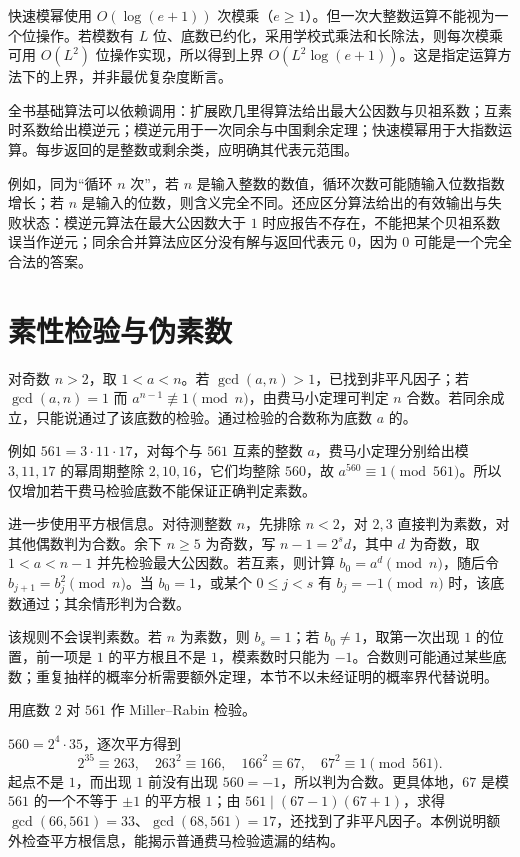 \documentclass[UTF8,12pt,a4paper,fontset=fandol]{ctexbook}
\begin{document}
快速模幂使用 $O(\log(e+1))$ 次模乘（$e\ge1$）。但一次大整数运算不能视为一个位操作。若模数有 $L$ 位、底数已约化，采用学校式乘法和长除法，则每次模乘可用 $O(L^2)$ 位操作实现，所以得到上界 $O(L^2\log(e+1))$。这是指定运算方法下的上界，并非最优复杂度断言。

全书基础算法可以依赖调用：扩展欧几里得算法给出最大公因数与贝祖系数；互素时系数给出模逆元；模逆元用于一次同余与中国剩余定理；快速模幂用于大指数运算。每步返回的是整数或剩余类，应明确其代表元范围。

例如，同为“循环 $n$ 次”，若 $n$ 是输入整数的数值，循环次数可能随输入位数指数增长；若 $n$ 是输入的位数，则含义完全不同。还应区分算法给出的有效输出与失败状态：模逆元算法在最大公因数大于 $1$ 时应报告不存在，不能把某个贝祖系数误当作逆元；同余合并算法应区分没有解与返回代表元 $0$，因为 $0$ 可能是一个完全合法的答案。

\section{素性检验与伪素数}

对奇数 $n>2$，取 $1<a<n$。若 $\gcd(a,n)>1$，已找到非平凡因子；若 $\gcd(a,n)=1$ 而 $a^{n-1}\not\equiv1\pmod n$，由费马小定理可判定 $n$ 合数。若同余成立，只能说通过了该底数的检验。通过检验的合数称为底数 $a$ 的。

例如 $561=3\cdot11\cdot17$，对每个与 $561$ 互素的整数 $a$，费马小定理分别给出模 $3,11,17$ 的幂周期整除 $2,10,16$，它们均整除 $560$，故 $a^{560}\equiv1\pmod{561}$。所以仅增加若干费马检验底数不能保证正确判定素数。

进一步使用平方根信息。对待测整数 $n$，先排除 $n<2$，对 $2,3$ 直接判为素数，对其他偶数判为合数。余下 $n\ge5$ 为奇数，写 $n-1=2^sd$，其中 $d$ 为奇数，取 $1<a<n-1$ 并先检验最大公因数。若互素，则计算 $b_0=a^d\pmod n$，随后令 $b_{j+1}=b_j^2\pmod n$。当 $b_0=1$，或某个 $0\le j<s$ 有 $b_j=-1\pmod n$ 时，该底数通过；其余情形判为合数。

该规则不会误判素数。若 $n$ 为素数，则 $b_s=1$；若 $b_0\ne1$，取第一次出现 $1$ 的位置，前一项是 $1$ 的平方根且不是 $1$，模素数时只能为 $-1$。合数则可能通过某些底数；重复抽样的概率分析需要额外定理，本节不以未经证明的概率界代替说明。

\begin{example}[检验失败给出了怎样的证据]
用底数 $2$ 对 $561$ 作 Miller--Rabin 检验。
\end{example}
\begin{solve}
$560=2^4\cdot35$，逐次平方得到
\[
 2^{35}\equiv263,\quad263^2\equiv166,\quad
 166^2\equiv67,\quad67^2\equiv1\pmod{561}.
\]
起点不是 $1$，而出现 $1$ 前没有出现 $560=-1$，所以判为合数。更具体地，$67$ 是模 $561$ 的一个不等于 $\pm1$ 的平方根 $1$；由 $561\mid(67-1)(67+1)$，求得 $\gcd(66,561)=33$、$\gcd(68,561)=17$，还找到了非平凡因子。本例说明额外检查平方根信息，能揭示普通费马检验遗漏的结构。
\end{solve}
\end{document}
